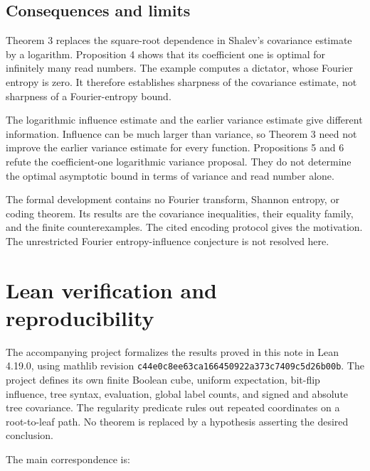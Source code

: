 \documentclass[
  american,
  11pt,
]{article}
\begin{document}
\subsection{Consequences and limits}\label{consequences-and-limits}

Theorem 3 replaces the square-root dependence in Shalev's covariance
estimate by a logarithm. Proposition 4 shows that its coefficient one is
optimal for infinitely many read numbers. The example computes a
dictator, whose Fourier entropy is zero. It therefore establishes
sharpness of the covariance estimate, not sharpness of a Fourier-entropy
bound.

The logarithmic influence estimate and the earlier variance estimate
give different information. Influence can be much larger than variance,
so Theorem 3 need not improve the earlier variance estimate for every
function. Propositions 5 and 6 refute the coefficient-one logarithmic
variance proposal. They do not determine the optimal asymptotic bound in
terms of variance and read number alone.

The formal development contains no Fourier transform, Shannon entropy,
or coding theorem. Its results are the covariance inequalities, their
equality family, and the finite counterexamples. The cited encoding
protocol gives the motivation. The unrestricted Fourier
entropy-influence conjecture is not resolved here.

\section{Lean verification and
reproducibility}\label{lean-verification-and-reproducibility}

The accompanying project formalizes the results proved in this note in
Lean 4.19.0, using mathlib revision
\texttt{c44e0c8ee63ca166450922a373c7409c5d26b00b}. The project defines
its own finite Boolean cube, uniform expectation, bit-flip influence,
tree syntax, evaluation, global label counts, and signed and absolute
tree covariance. The regularity predicate rules out repeated coordinates
on a root-to-leaf path. No theorem is replaced by a hypothesis asserting
the desired conclusion.

The main correspondence is:
\end{document}
